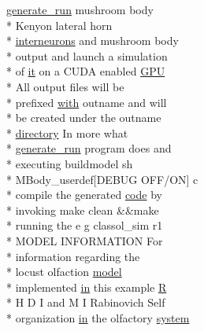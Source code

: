 \begin{DoxyCompactItemize}
\hyperlink{userproject_2MBody__userdef__project_2README_8txt_a320a215d1e27b4de394be70e90d22863}{generate\+\_\+run} mushroom body \\*
Kenyon lateral horn \\*
\hyperlink{userproject_2SynDelay__project_2README_8txt_adf6327d22e2c11a62a22ab5afd4f2b81}{interneurons} and mushroom body \\*
output and launch a simulation \\*
of \hyperlink{userproject_2PoissonIzh__project_2README_8txt_a3e3bbb6c9b14c38757cf273a117e43e8}{it} on a C\+U\+D\+A enabled \hyperlink{modelSpec_8h_a39cb9803524b6f3b783344b2f89867b4}{G\+P\+U} \\*
All output files will be \\*
prefixed \hyperlink{userproject_2OneComp__project_2README_8txt_ace09bb40fbf4457ad9a9340a67a4fa9a}{with} outname and will \\*
be created under the outname \\*
\hyperlink{README_8txt_ae619b68020535fba5ac79522a0d9d1c4}{directory} In more what \\*
\hyperlink{userproject_2MBody__userdef__project_2README_8txt_a320a215d1e27b4de394be70e90d22863}{generate\+\_\+run} program does and \\*
executing buildmodel sh \\*
M\+Body\+\_\+userdef\mbox{[}D\+E\+B\+U\+G O\+F\+F/O\+N\mbox{]} c \\*
compile the generated \hyperlink{userproject_2MBody__userdef__project_2README_8txt_aeec4e596748e7c29dd5548dae4c70685}{code} by \\*
invoking make clean \&\&make \\*
running the e g classol\+\_\+sim r1 \\*
M\+O\+D\+E\+L I\+N\+F\+O\+R\+M\+A\+T\+I\+O\+N For \\*
information regarding the \\*
locust olfaction \hyperlink{README_8txt_a69fd801b7213948c12d9dd7eebb3ed14}{model} \\*
implemented \hyperlink{README_8txt_a148897a6b2cc9cff25af80abb13426b0}{in} this example \hyperlink{gen__syns__sparse__izhModel_8cc_ac06fcc1e53c6b21275aec67047473a28}{R} \\*
H D I and M I Rabinovich Self \\*
organization \hyperlink{README_8txt_a148897a6b2cc9cff25af80abb13426b0}{in} the olfactory \hyperlink{userproject_2MBody__userdef__project_2README_8txt_a8944a42451a985d439625b4a2ecdb611}{system}
\item 

\end{DoxyCompactItemize}
